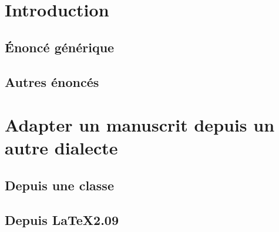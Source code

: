 \documentclass[11pt,french]{smfart}
\begin{document}
\tableofcontents

\section{Introduction}





\subsection{\'Enonc\'e g\'en\'erique}



\subsection{Autres \'enonc\'es}



\section{Adapter un manuscrit depuis un autre dialecte}


\subsection{Depuis une classe \LaTeXe}


\subsection{Depuis \LaTeX2.09}

\begin{thebibliography}{99}

\end{thebibliography}
\end{document}
